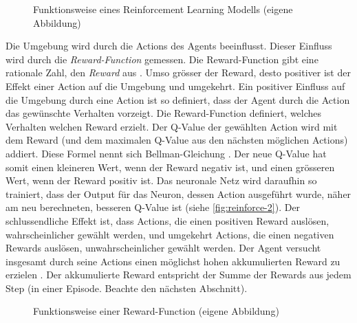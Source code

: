 \begin{figure}[!ht]
   \centering
   \caption{Funktionsweise eines Reinforcement Learning Modells (eigene Abbildung)}\label{fig:reinforce-1}
\end{figure}
 
Die Umgebung wird durch die Actions des Agents beeinflusst. Dieser Einfluss wird
durch die \emph{Reward-Function} gemessen. Die Reward-Function gibt eine
rationale Zahl, den \emph{Reward} aus \cite[S. 75]{sutton_reinforcement_2014}.
Umso grösser der Reward, desto positiver ist der Effekt einer Action auf die
Umgebung und umgekehrt. Ein positiver Einfluss auf die Umgebung durch eine
Action ist so definiert, dass der Agent durch die Action das gewünschte
Verhalten vorzeigt. Die Reward-Function definiert, welches Verhalten welchen
Reward erzielt. Der Q-Value der gewählten Action wird mit dem Reward (und dem
maximalen Q-Value aus den nächsten möglichen Actions) addiert. Diese Formel
nennt sich Bellman-Gleichung \cite[S. 3]{mnih_playing_2013}. Der neue Q-Value
hat somit einen kleineren Wert, wenn der Reward negativ ist, und einen grösseren
Wert, wenn der Reward positiv ist. Das neuronale Netz wird daraufhin so
trainiert, dass der Output für das Neuron, dessen Action ausgeführt wurde, näher
am neu berechneten, besseren Q-Value ist (siehe \autoref{fig:reinforce-2}). Der
schlussendliche Effekt ist, dass Actions, die einen positiven Reward auslösen,
wahrscheinlicher gewählt werden, und umgekehrt Actions, die einen negativen
Rewards auslösen, unwahrscheinlicher gewählt werden. Der Agent versucht
insgesamt durch seine Actions einen möglichst hohen akkumulierten Reward zu
erzielen \cite[S. 57]{sutton_reinforcement_2014}. Der akkumulierte Reward
entspricht der Summe der Rewards aus jedem Step (in einer Episode. Beachte den
nächsten Abschnitt).
 
\begin{figure}[!ht]
   \centering
   \caption{Funktionsweise einer Reward-Function (eigene Abbildung)}\label{fig:reinforce-2}
\end{figure}
 
